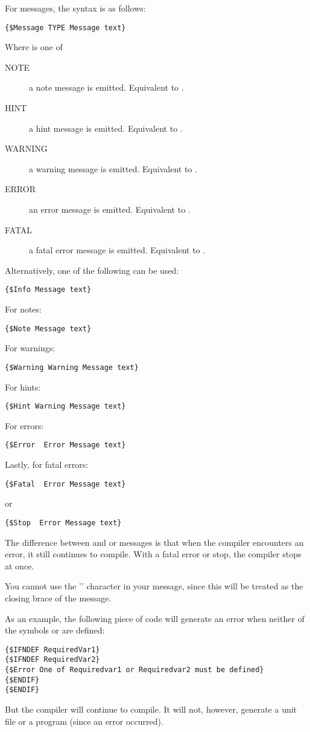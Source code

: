 For messages, the syntax is as follows:
\begin{verbatim}
{$Message TYPE Message text}
\end{verbatim}
Where  is one of 
\begin{description}
\item[NOTE] a note message is emitted. Equivalent to .
\item[HINT] a hint message is emitted. Equivalent to .
\item[WARNING] a warning message is emitted. Equivalent to .
\item[ERROR] an error message is emitted. Equivalent to .
\item[FATAL] a fatal error message is emitted. Equivalent to .
\end{description}
Alternatively, one of the following can be used:
\begin{verbatim}
{$Info Message text}
\end{verbatim}
For notes:
\begin{verbatim}
{$Note Message text}
\end{verbatim}
For warnings:
\begin{verbatim}
{$Warning Warning Message text}
\end{verbatim}
For hints:
\begin{verbatim}
{$Hint Warning Message text}
\end{verbatim}
For errors:
\begin{verbatim}
{$Error  Error Message text}
\end{verbatim}
Lastly, for fatal errors:
\begin{verbatim}
{$Fatal  Error Message text}
\end{verbatim}
or
\begin{verbatim}
{$Stop  Error Message text}
\end{verbatim}
The difference between  and  or 
messages is that when the compiler encounters an error, it still continues
to compile. With a fatal error or stop, the compiler stops at once.

\begin{remark}You cannot use the '\var{\}}' character in your message, since
this will be treated as the closing brace of the message.
\end{remark}
As an example, the following piece of code will generate an error when
neither of the symbols  or  are defined:
\begin{verbatim}
{$IFNDEF RequiredVar1}
{$IFNDEF RequiredVar2}
{$Error One of Requiredvar1 or Requiredvar2 must be defined}
{$ENDIF}
{$ENDIF}
\end{verbatim}
But the compiler will continue to compile. It will not, however, generate a
unit file or a program (since an error occurred).

